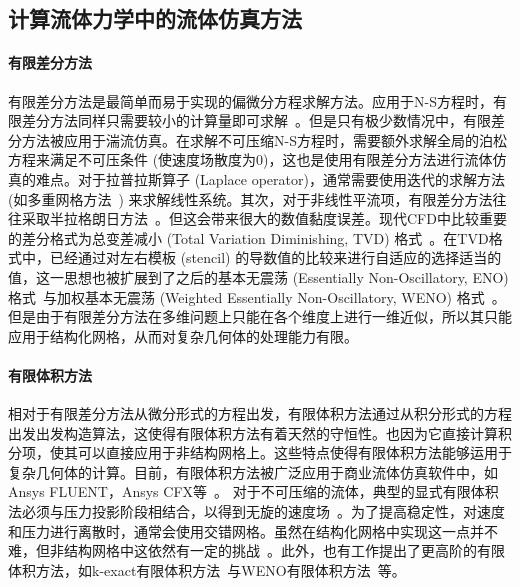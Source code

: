 \subsection{计算流体力学中的流体仿真方法}
\label{sec:1_related_works_CFD}
\paragraph{有限差分方法}
有限差分方法是最简单而易于实现的偏微分方程求解方法。应用于N-S方程时，有限差分方法同样只需要较小的计算量即可求解~\citep{kooij2018comparison,vreman2014comparison}。但是只有极少数情况中，有限差分方法被应用于湍流仿真。在求解不可压缩N-S方程时，需要额外求解全局的泊松方程来满足不可压条件 (使速度场散度为0)，这也是使用有限差分方法进行流体仿真的难点。对于拉普拉斯算子 (Laplace operator)，通常需要使用迭代的求解方法 (如多重网格方法~\citep{golub2013matrix}) 来求解线性系统。其次，对于非线性平流项，有限差分方法往往采取半拉格朗日方法~\citep{smolarkiewicz1992class}。但这会带来很大的数值黏度误差。现代CFD中比较重要的差分格式为总变差减小 (Total Variation Diminishing, TVD) 格式~\citep{osher1986very, YEE1985327, HARTEN1983357}。在TVD格式中，已经通过对左右模板 (stencil) 的导数值的比较来进行自适应的选择适当的值，这一思想也被扩展到了之后的基本无震荡 (Essentially Non-Oscillatory, ENO) 格式~\citep{HARTEN19973, SHU198932, SHU1988439}与加权基本无震荡 (Weighted Essentially Non-Oscillatory, WENO) 格式~\citep{LIU1994200}。但是由于有限差分方法在多维问题上只能在各个维度上进行一维近似，所以其只能应用于结构化网格，从而对复杂几何体的处理能力有限。

\paragraph{有限体积方法}
相对于有限差分方法从微分形式的方程出发，有限体积方法通过从积分形式的方程出发出发构造算法，这使得有限体积方法有着天然的守恒性。也因为它直接计算积分项，使其可以直接应用于非结构网格上。这些特点使得有限体积方法能够运用于复杂几何体的计算。目前，有限体积方法被广泛应用于商业流体仿真软件中，如Ansys FLUENT，Ansys CFX等~\citep{JEONG201419}。 
对于不可压缩的流体，典型的显式有限体积法必须与压力投影阶段相结合，以得到无旋的速度场~\citep{https://doi.org/10.1002/fld.310, pember1996higher}。为了提高稳定性，对速度和压力进行离散时，通常会使用交错网格。虽然在结构化网格中实现这一点并不难，但非结构网格中这依然有一定的挑战~\citep{herbin2012staggered, gao2012unstructured, bermudez1998upwind}。此外，也有工作提出了更高阶的有限体积方法，如k-exact有限体积方法~\citep{barth1990higher}与WENO有限体积方法~\citep{HU199997}等。

